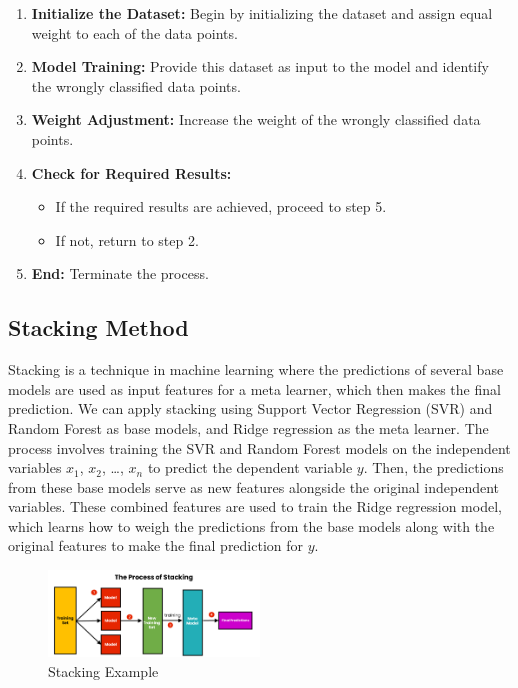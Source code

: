 \documentclass[conference]{IEEEtran}
\begin{document}
\begin{enumerate}
    \item \textbf{Initialize the Dataset:} Begin by initializing the dataset and assign equal weight to each of the data points.
    
    \item \textbf{Model Training:} Provide this dataset as input to the model and identify the wrongly classified data points.
    
    \item \textbf{Weight Adjustment:} Increase the weight of the wrongly classified data points.
    
    \item \textbf{Check for Required Results:} 
    \begin{itemize}
        \item If the required results are achieved, proceed to step 5.
        \item If not, return to step 2.
    \end{itemize}
    
    \item \textbf{End:} Terminate the process.
\end{enumerate}

\subsection{Stacking Method}
Stacking is a technique in machine learning where the predictions of several base models are used as input features for a meta learner, which then makes the final prediction. We can apply stacking using Support Vector Regression (SVR) and Random Forest as base models, and Ridge regression as the meta learner.
The process involves training the SVR and Random Forest models on the independent variables $x_1$, $x_2$, \ldots, $x_n$ to predict the dependent variable $y$. Then, the predictions from these base models serve as new features alongside the original independent variables. These combined features are used to train the Ridge regression model, which learns how to weigh the predictions from the base models along with the original features to make the final prediction for $y$.

\begin{figure}[htbp]
    \centering
    \includegraphics[width=0.5\textwidth]{Figure/stacking.png} %
    \caption{Stacking Example}
    \label{fig:example}
\end{figure}
\end{document}

